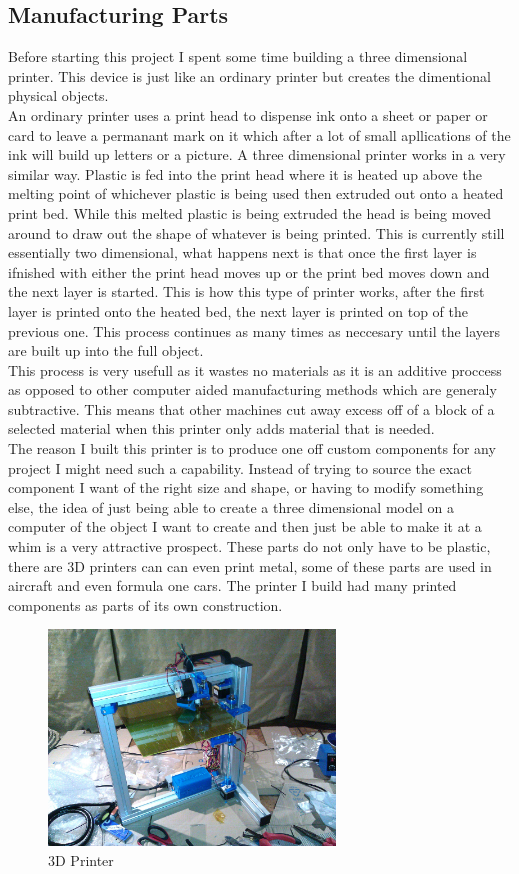\subsection{Manufacturing Parts}
Before starting this project I spent some time building a three dimensional printer.  This device is just like an ordinary printer but creates the dimentional physical objects.
\\An ordinary printer uses a print head to dispense ink onto a sheet or paper or card to leave a permanant mark on it which after a lot of small apllications of the ink will build up letters or a picture.  A three dimensional printer works in a very similar way.  Plastic is fed into the print head where it is heated up above the melting point of whichever plastic is being used then extruded out onto a heated print bed.  While this melted plastic is being extruded the head is being moved around to draw out the shape of whatever is being printed.  This is currently still essentially two dimensional, what happens next is that once the first layer is ifnished with either the print head moves up or the print bed moves down and the next layer is started.  This is how this type of printer works, after the first layer is printed onto the heated bed, the next layer is printed on top of the previous one.  This process continues as many times as neccesary until the layers are built up into the full object.
\\This process is very usefull as it wastes no materials as it is an additive proccess as opposed to other computer aided manufacturing methods which are generaly subtractive.  This means that other machines cut away excess off of a block of a selected material when this printer only adds material that is needed.
\\The reason I built this printer is to produce one off custom components for any project I might need such a capability.  Instead of trying to source the exact component I want of the right size and shape, or having to modify something else, the idea of just being able to create a three dimensional model on a computer of the object I want to create and then just be able to make it at a whim is a very attractive prospect.  These parts do not only have to be plastic, there are 3D printers can can even print metal, some of these parts are used in aircraft and even formula one cars.  The printer I build had many printed components as parts of its own construction.
\begin{figure}[h]
\centering
        \includegraphics[width=3.0in]  {Images/printer.jpg}
        \caption{3D Printer}
        \label{3D Printer}
\end{figure}
